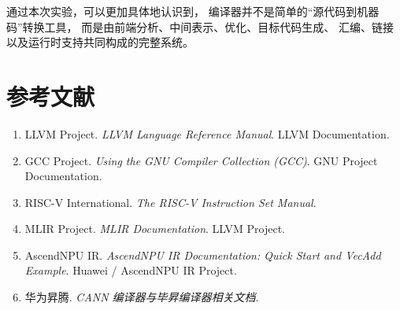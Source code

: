 \documentclass[12pt,a4paper]{ctexart}
\begin{document}
通过本次实验，可以更加具体地认识到，
编译器并不是简单的“源代码到机器码”转换工具，
而是由前端分析、中间表示、优化、目标代码生成、
汇编、链接以及运行时支持共同构成的完整系统。
\section*{参考文献}

\begin{enumerate}

\item
LLVM Project.
\textit{LLVM Language Reference Manual}.
LLVM Documentation.

\item
GCC Project.
\textit{Using the GNU Compiler Collection (GCC)}.
GNU Project Documentation.

\item
RISC-V International.
\textit{The RISC-V Instruction Set Manual}.

\item
MLIR Project.
\textit{MLIR Documentation}.
LLVM Project.

\item
AscendNPU IR.
\textit{AscendNPU IR Documentation: Quick Start and VecAdd Example}.
Huawei / AscendNPU IR Project.

\item
华为昇腾.
\textit{CANN 编译器与毕昇编译器相关文档}.

\end{enumerate}
\end{document}
